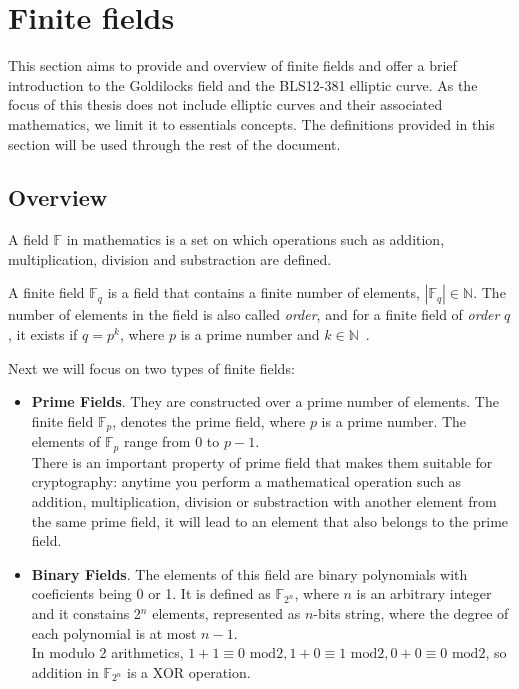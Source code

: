 \section{Finite fields}
\label{sec:finite-fields}
This section aims to provide and overview of finite fields and offer a brief introduction to the Goldilocks field and the BLS12-381 elliptic curve. As the focus of this thesis does not include elliptic curves and their associated mathematics, we limit it to essentials concepts. The definitions provided in this section will be used through the rest of the document.

\subsection*{Overview}
A field $\mathbb{F}$ in mathematics is a set on which operations such as addition, multiplication, division and substraction are defined.

A finite field $\mathbb{F}_q$ is a field that contains a finite number of elements, $|\mathbb{F}_q| \in\mathbb{N}$. The number of elements in the field is also called \textit{order}, and for a finite field of \textit{order} $q$, it exists if $q=p^k$, where $p$ is a prime number and $k\in\mathbb{N}$~\cite{cramer1998zero}.

Next we will focus on two types of finite fields:
\begin{itemize}
    \item \textbf{Prime Fields}. They are constructed over a prime number of elements. The finite field $\mathbb{F}_p$, denotes the prime field, where $p$ is a prime number. The elements of $\mathbb{F}_p$ range from $0$ to $p-1$.\\
    There is an important property of prime field that makes them suitable for cryptography: anytime you perform a mathematical operation such as addition, multiplication, division or substraction with another element from the same prime field, it will lead to an element that also belongs to the prime field.
    \item \textbf{Binary Fields}. The elements of this field are binary polynomials with coeficients being 0 or 1. It is defined as $\mathbb{F}_{2^n}$, where $n$ is an arbitrary integer and it constains 2$^n$ elements, represented as $n$-bits string, where the degree of each polynomial is at most $n-1$.\\
    In modulo 2 arithmetics, $1+1\equiv\text{0 mod2}, 1+0\equiv\text{1 mod2}, 0+0\equiv\text{0 mod2}$, so addition in $\mathbb{F}_{2^n}$ is a XOR operation.
\end{itemize}

